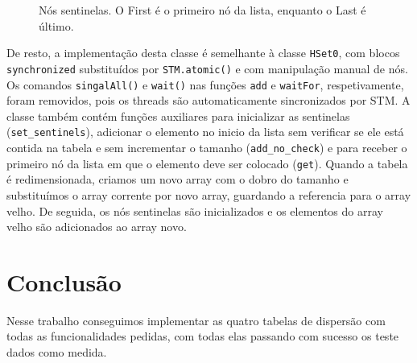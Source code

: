 \documentclass{report}
\begin{document}
\begin{figure}[!h]
  \centering
  \caption{ \centering Nós sentinelas. O First é o primeiro nó da lista, enquanto o Last é último. }
  \label{sentinels}
\end{figure}

De resto, a implementação desta classe é semelhante à classe \texttt{HSet0}, com blocos \texttt{synchronized} substituídos por \texttt{STM.atomic()} e com manipulação manual de nós. Os comandos \texttt{singalAll()} e \texttt{wait()} nas funções \texttt{add} e \texttt{waitFor}, respetivamente, foram removidos, pois os threads são automaticamente sincronizados por STM. A classe também contém funções auxiliares para inicializar as sentinelas (\texttt{set\_sentinels}), adicionar o elemento no inicio da lista sem verificar se ele está contida na tabela e sem incrementar o tamanho (\texttt{add\_no\_check}) e para receber o primeiro nó da lista em que o elemento deve ser colocado (\texttt{get}). Quando a tabela é redimensionada, criamos um novo array com o dobro do tamanho e substituímos o array corrente por novo array, guardando a referencia para o array velho. De seguida, os nós sentinelas são inicializados e os elementos do array velho são adicionados ao array novo.

\chapter{Conclusão}
Nesse trabalho conseguimos implementar as quatro tabelas de dispersão com todas as funcionalidades pedidas, com todas elas passando com sucesso os teste dados como medida.
\end{document}
